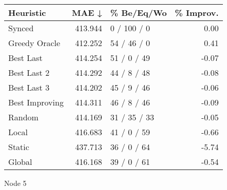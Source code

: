 \begin{tabular}{lrlr}
\toprule
\textbf{Heuristic} & \textbf{MAE ↓} & \textbf{\% Be/Eq/Wo} & \textbf{\% Improv.} \\
\midrule
            Synced &        413.944 &          0 / 100 / 0 &                0.00 \\
     Greedy Oracle &        412.252 &          54 / 46 / 0 &                0.41 \\
         Best Last &        414.254 &          51 / 0 / 49 &               -0.07 \\
       Best Last 2 &        414.292 &          44 / 8 / 48 &               -0.08 \\
       Best Last 3 &        414.202 &          45 / 9 / 46 &               -0.06 \\
    Best Improving &        414.311 &          46 / 8 / 46 &               -0.09 \\
            Random &        414.169 &         31 / 35 / 33 &               -0.05 \\
             Local &        416.683 &          41 / 0 / 59 &               -0.66 \\
            Static &        437.713 &          36 / 0 / 64 &               -5.74 \\
            Global &        416.168 &          39 / 0 / 61 &               -0.54 \\
\bottomrule
\end{tabular}
\caption{Node 5}
\label{tab:non_lr01_le2_bs2_5}
